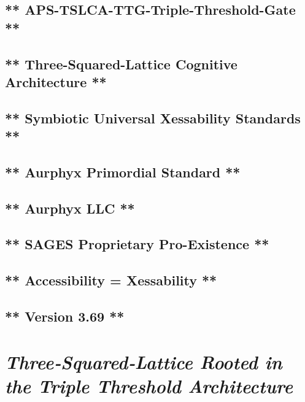 \subsection{** APS-TSLCA-TTG-Triple-Threshold-Gate **}\label{aps-tslca-ttg-triple-threshold-gate}

\subsection{** Three-Squared-Lattice Cognitive Architecture **}\label{three-squared-lattice-cognitive-architecture}

\subsection{** Symbiotic Universal Xessability Standards **}\label{symbiotic-universal-xessability-standards}

\subsection{** Aurphyx Primordial Standard **}\label{aurphyx-primordial-standard}

\subsection{** Aurphyx LLC **}\label{aurphyx-llc}

\subsection{** SAGES \textbar{} Proprietary \textbar{} Pro-Existence **}\label{sages-proprietary-pro-existence}

\subsection{** Accessibility = Xessability **}\label{accessibility-xessability}

\subsection{** Version 3.69 **}\label{version-3.69}

\section{\texorpdfstring{\emph{Three‑Squared‑Lattice Rooted in the Triple Threshold Architecture}}{Three‑Squared‑Lattice Rooted in the Triple Threshold Architecture}}\label{threesquaredlattice-rooted-in-the-triple-threshold-architecture}

